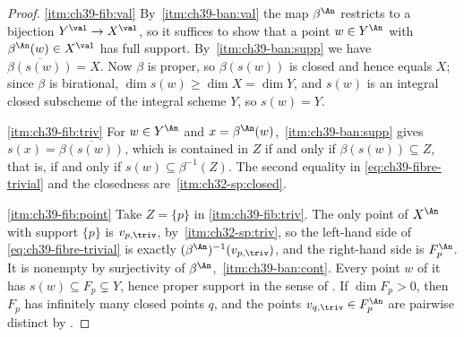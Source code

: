 \begin{proof}
\cref{itm:ch39-fib:val}  By
\,\cref{itm:ch39-ban:val} the map $\beta^{\An}$
restricts to a bijection $Y^{\val}\to X^{\val}$, so it suffices to show
that a point $w\in Y^{\An}$ with $\beta^{\An}(w)\in X^{\val}$ has full
support.  By \,\cref{itm:ch39-ban:supp} we have
$\overline{\beta(s(w))}=X$.  Now $\beta$ is proper, so
$\beta(s(w))$ is closed and hence equals $X$; since $\beta$ is
birational, $\dim s(w)\ge\dim X=\dim Y$, and $s(w)$ is an integral
closed subscheme of the integral scheme $Y$, so $s(w)=Y$.

\cref{itm:ch39-fib:triv}  For $w\in Y^{\An}$ and $x=\beta^{\An}(w)$,
\,\cref{itm:ch39-ban:supp} gives
$s(x)=\overline{\beta(s(w))}$, which is contained in $Z$ if and only if
$\beta(s(w))\subseteq Z$, that is, if and only if
$s(w)\subseteq\beta^{-1}(Z)$.  The second equality in
\eqref{eq:ch39-fibre-trivial} and the closedness are
\,\cref{itm:ch32-sp:closed}.

\cref{itm:ch39-fib:point}  Take $Z=\{p\}$ in \cref{itm:ch39-fib:triv}.  The
only point of $X^{\An}$ with support $\{p\}$ is $v_{p,\triv}$, by
\,\cref{itm:ch32-sp:triv}, so the left-hand
side of \eqref{eq:ch39-fibre-trivial} is exactly
$(\beta^{\An})^{-1}(v_{p,\triv})$, and the right-hand side is
$F_p^{\An}$.  It is nonempty by surjectivity of $\beta^{\An}$,
\,\cref{itm:ch39-ban:cont}.  Every point $w$ of it
has $s(w)\subseteq F_p\subsetneq Y$, hence proper support in the sense of
.  If $\dim F_p>0$, then $F_p$ has
infinitely many closed points $q$, and the points $v_{q,\triv}\in
F_p^{\An}$ are pairwise distinct by
.
\end{proof}

